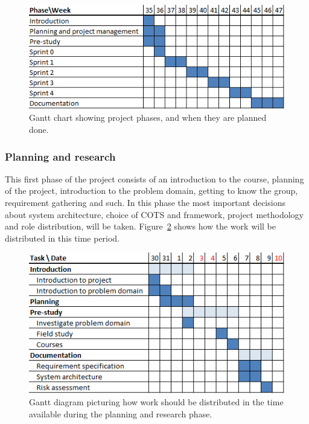 \begin{figure}[h]
\centering
  \includegraphics[width=1.0\textwidth]{project_management/project_effort_estimation}
  \caption[Gantt chart of project phases]{Gantt chart showing project phases, and when they are planned done.}
  \label{gantt:project}
\end{figure}

\subsubsection{Planning and research}

This first phase of the project consists of an introduction to the course,
planning of the project, introduction to the problem domain, getting to know
the group, requirement gathering and such. In this phase the most important
decisions about system architecture, choice of COTS and framework, project
methodology and role distribution, will be taken. Figure~\ref{gantt:pre_imp}
shows how the work will be distributed in this time period.

\begin{figure}[h]
\centering
  \includegraphics[width=1.0\textwidth]{project_management/pre_implementation_gantt}
  \caption[Gantt chart of planning and research phase]{Gantt diagram picturing how work should be distributed in the time available during the planning and research phase.}
  \label{gantt:pre_imp}
\end{figure}

